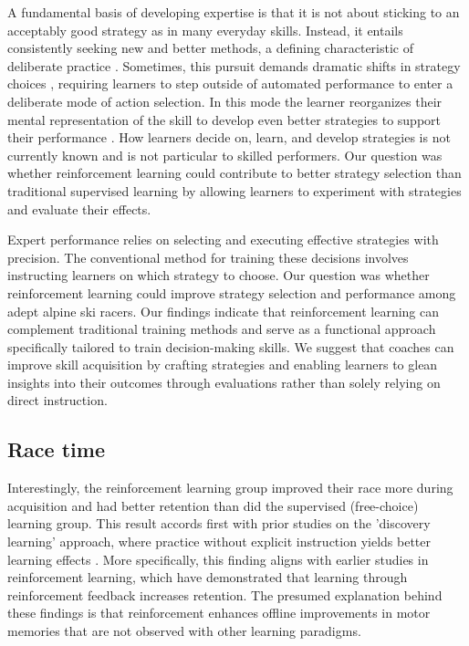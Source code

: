 \documentclass{article}
\begin{document}
A fundamental basis of developing expertise is that it is not about sticking to an acceptably good strategy as in many everyday skills. Instead, it entails consistently seeking new and better methods, a defining characteristic of deliberate practice \cite{ericsson_development_2003, ericsson_expert_1994, ericsson_role_1993}. Sometimes, this pursuit demands dramatic shifts in strategy choices \cite{taylor_cerebellar_2014, taylor_role_2012, gray_plateaus_2017}, requiring learners to step outside of automated  performance to enter a deliberate mode of action selection\cite{du_relationship_2022}.  In this mode the learner reorganizes their mental representation of the skill to develop even better strategies to support their performance \cite{du_relationship_2022}. How learners decide on, learn, and develop strategies is not currently known\cite{taylor_role_2012, taylor_cerebellar_2014, chen_effects_2018} and is not particular to skilled performers. Our question was whether reinforcement learning could contribute to better strategy selection than traditional supervised learning by allowing learners to experiment with strategies and evaluate their effects. 

Expert performance relies on selecting and executing effective strategies with precision. The conventional method for training these decisions involves instructing learners on which strategy to choose. Our question was whether reinforcement learning could improve strategy selection and performance among adept alpine ski racers. Our findings indicate that reinforcement learning can complement traditional training methods and serve as a functional approach specifically tailored to train decision-making skills. We suggest that coaches can improve skill acquisition by crafting strategies and enabling learners to glean insights into their outcomes through evaluations rather than solely relying on direct instruction. 


\subsection{Race time}
Interestingly, the reinforcement learning group improved their race more during acquisition and had better retention than did the supervised (free-choice) learning group. This result accords first with prior studies on the 'discovery learning' approach, where practice without explicit instruction yields better learning effects \cite{wulf_instructions_1997, hodges_learning_2001}. More specifically, this finding aligns with earlier studies in reinforcement learning, which have demonstrated that learning through reinforcement feedback increases retention\cite{therrien_effective_2016, truong_error-based_2023, hasson_reinforcement_2015}. The presumed explanation behind these findings is that reinforcement enhances offline improvements in motor memories that are not observed with other learning paradigms. 
\end{document}
